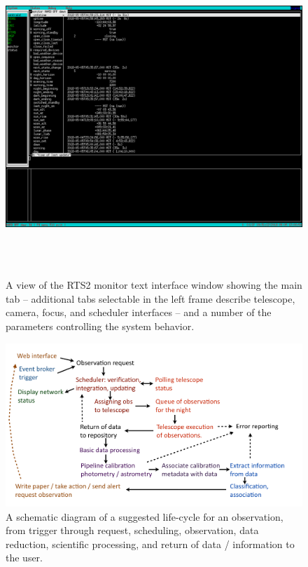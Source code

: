 \documentclass[]{spie}  %
\begin{document}
  \begin{figure} [ht]
   \begin{center}
   \includegraphics[height=12cm]{rts2mon_screenshot1.png}
  \end{center}
   \caption[] 
   { \label{fig:rts2mon} 
A view of the RTS2 monitor text interface window showing the main tab -- additional tabs selectable in the left frame describe telescope, camera, focus, and scheduler interfaces -- and a number of the parameters controlling the system behavior.
}
  \end{figure} 

 \begin{figure} [ht]
   \begin{center}
   \includegraphics[width=15cm]{obs_lifecycle.png}
  \end{center}
   \caption[] 
   { \label{fig:lifecycle} 
A schematic diagram of a suggested life-cycle for an observation, from trigger through request, scheduling, observation, data reduction, scientific processing, and return of data / information to the user.
}
  \end{figure} 
\end{document}
